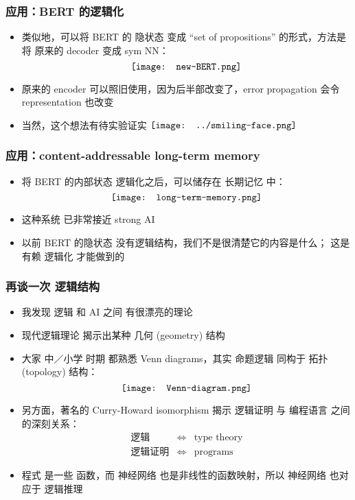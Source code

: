 \documentclass[16pt]{beamer}
\newcommand{\cc}[2]{#1}
\newcommand{\cc}[2]{#2}
\newcommand{\emp}[1]{{\color{violet}#1}}
\newcommand{\smiley}{$\vcenter{\hbox{\texttt{[image: ../smiling-face.png]}}}$}
\begin{document}
\begin{frame}
\frametitle{\cc{应用：BERT 的逻辑化}{Logicalization of BERT}}
\begin{itemize}
	\item 类似地，可以将 BERT 的 隐状态 变成 ``set of propositions'' 的形式，方法是将 原来的 decoder 变成 sym NN：
	\begin{equation}
	\vcenter{\hbox{\texttt{[image: new-BERT.png]}}}
	\end{equation}
	\item 原来的 encoder 可以照旧使用，因为后半部改变了，error propagation 会令 representation 也改变
	\item 当然，这个想法有待实验证实 \smiley
\end{itemize}
\end{frame}

\begin{frame}
\frametitle{应用：content-addressable long-term memory}
\begin{itemize}
	\item 将 BERT 的内部状态 逻辑化之后，可以储存在 \emp{长期记忆} 中：
	\begin{equation}
	\vcenter{\hbox{\texttt{[image: long-term-memory.png]}}}
	\end{equation}
	\item 这种系统 已非常接近 strong AI
	\item 以前 BERT 的隐状态 没有逻辑结构，我们不是很清楚它的内容是什么； 这是有赖 \emp{逻辑化} 才能做到的
\end{itemize}
\end{frame}

\begin{frame}
\frametitle{再谈一次 逻辑结构}
\begin{itemize}
	\item 我发现 逻辑 和 AI 之间 有很漂亮的理论
	\item 现代逻辑理论 揭示出某种 \emp{几何} (geometry) 结构
	\item 大家 中／小学 时期 都熟悉 Venn diagrams，其实 命题逻辑 同构于 \emp{拓扑} (topology) 结构：
	\begin{equation}
	\vcenter{\hbox{\texttt{[image: Venn-diagram.png]}}}
	\end{equation}

	\item 另方面，著名的 Curry-Howard isomorphism 揭示 \emp{逻辑证明} 与 \emp{编程语言} 之间的深刻关系：
	\begin{eqnarray}
	\mbox{逻辑} & \Leftrightarrow & \mbox{type theory} \\
	\mbox{逻辑证明} & \Leftrightarrow & \mbox{programs} \nonumber
	\end{eqnarray}
	\item 程式 是一些 \emp{函数}，而 神经网络 也是非线性的函数\emp{映射}，所以 神经网络 也\emp{对应于} 逻辑推理
\end{itemize}
\end{frame}
\end{document}
